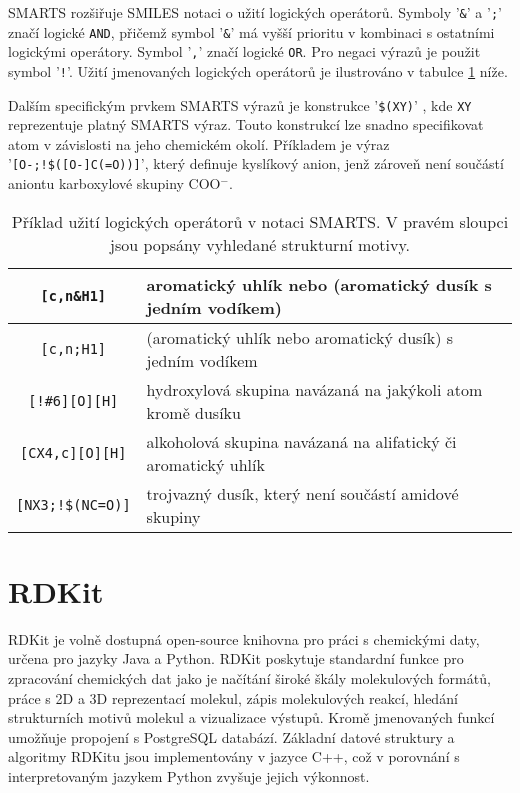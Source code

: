SMARTS rozšiřuje SMILES notaci o užití logických operátorů. Symboly '\verb|&|' a '\verb|;|' značí logické \verb|AND|, přičemž symbol '\verb|&|' má vyšší prioritu v kombinaci s ostatními logickými operátory. Symbol '\verb|,|' značí logické \verb|OR|. Pro negaci výrazů je použit symbol '\verb|!|'. Užití jmenovaných logických operátorů je ilustrováno v tabulce \ref{logops} níže.

Dalším specifickým prvkem SMARTS výrazů je konstrukce  '\verb|$(XY)|' , kde \verb|XY| reprezentuje platný SMARTS výraz. Touto konstrukcí lze snadno specifikovat atom v závislosti na jeho chemickém okolí. Příkladem je výraz '\verb|[O-;!$([O-]C(=O))]|', který definuje kyslíkový anion, jenž zároveň není součástí aniontu karboxylové skupiny COO$^-$. 
\begin{table}[h]
\label{logops}
\renewcommand{\arraystretch}{1.3}
    \begin{small}
    \hspace{7mm}\begin{tabular}{c|l}
        \verb|[c,n&H1]| & aromatický uhlík nebo (aromatický dusík s jedním vodíkem) \\
        \hline
        \verb|[c,n;H1]| & (aromatický uhlík nebo aromatický dusík) s jedním vodíkem \\
        \hline
        \verb|[!#6][O][H]| & hydroxylová skupina navázaná na jakýkoli atom kromě dusíku \\
        \hline
        \verb|[CX4,c][O][H]| & alkoholová skupina navázaná na alifatický či aromatický uhlík \\
        \hline
        \verb|[NX3;!$(NC=O)]| & trojvazný dusík, který není součástí amidové skupiny\\
    \end{tabular}
    \end{small}
    \caption{Příklad užití logických operátorů v notaci SMARTS. V pravém sloupci jsou popsány vyhledané strukturní motivy.}
\end{table}
\section{RDKit}
RDKit \cite{rdk_info} je volně dostupná open-source knihovna pro práci s chemickými daty, určena pro jazyky Java a Python. RDKit poskytuje standardní funkce pro zpracování chemických dat jako je načítání široké škály molekulových formátů, práce s 2D a 3D reprezentací molekul, zápis molekulových reakcí, hledání strukturních motivů molekul a vizualizace výstupů. Kromě jmenovaných funkcí umožňuje propojení s PostgreSQL databází. Základní datové struktury a algoritmy RDKitu jsou implementovány v jazyce C++, což v porovnání s interpretovaným jazykem Python zvyšuje jejich výkonnost.

